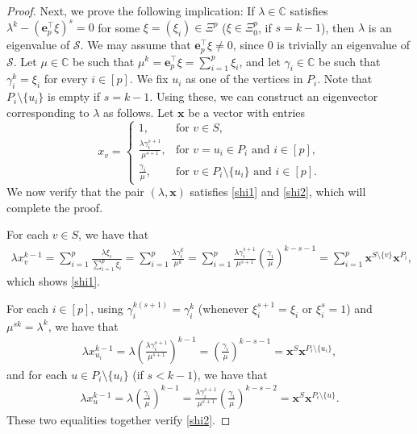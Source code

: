 \documentclass{article}
\begin{document}
\begin{proof}
Next, we prove the following implication: If $\lambda \in \mathbb{C}$ satisfies $\lambda^{k}-(\mathbf{e}_{p}^{\top}\xi)^{s}=0$ for some $\xi = (\xi_i) \in\Xi^{p}$ ($\xi\in\Xi_{0}^{p}$, if $s=k-1$), then $\lambda$ is an eigenvalue of $\mathcal{S}$.
We may assume that $\mathbf{e}_{p}^{\top}\xi \neq 0$, since $0$ is trivially an eigenvalue of $\mathcal{S}$.
Let $\mu \in\mathbb{C}$ be such that $\mu^{k}=\mathbf{e}_{p}^{\top}\xi =\sum_{i=1}^p \xi_i$, and let $\gamma_i \in\mathbb{C}$ be such that $\gamma_i^k =\xi_i$ for every $i \in [p]$.
We fix $u_{i}$ as one of the vertices in $P_{i}$. Note that $P_{i}\setminus\{u_{i}\}$ is empty if $s=k-1$. Using these, we can construct an eigenvector corresponding to $\lambda$ as follows. Let $\mathbf{x}$ be a vector with entries
\begin{equation*}
x_{v}=\begin{cases}
1, &\text{for $v\in S$},\\
\frac{\lambda \gamma_i^{s+1}}{\mu^{s+1}}, &\text{for $v=u_{i}\in P_{i}$ and $i\in[p]$},\\
\frac{\gamma_i}{\mu}, &\text{for $v\in P_{i}\setminus\{u_{i}\}$ and $i\in[p]$}.
\end{cases}
\end{equation*}
We now verify that the pair $(\lambda,\mathbf{x})$ satisfies \eqref{shi1} and \eqref{shi2}, which will complete the proof.

For each $v\in S$, we have that
\begin{align*}
\lambda x_{v}^{k-1}=\sum_{i=1}^{p}\frac{\lambda \xi_i}{\sum_{i=1}^p \xi_i}=
\sum_{i=1}^{p}\frac{\lambda \gamma_i^k}{\mu^k}=\sum_{i=1}^{p}\frac{\lambda \gamma_i^{s+1}}{\mu^{s+1}}\left(\frac{\gamma_i}{\mu}\right)^{k-s-1}=\sum_{i=1}^p\mathbf{x}^{S\setminus\{v\}}\mathbf{x}^{P_{i}},
\end{align*}
which shows  \eqref{shi1}.

For each $i\in[p]$, using $\gamma_i^{k(s+1)}=\gamma_i^k$ (whenever $\xi_i^{s+1}=\xi_i$ or $\xi_i^{s}=1$) and $\mu^{sk}=\lambda^k$, we have that
\begin{align*}
\lambda x_{u_{i}}^{k-1}=\lambda\left(\frac{\lambda\gamma_i^{s+1}}{\mu^{s+1}}\right)^{k-1}= \left(\frac{\gamma_i}{\mu}\right)^{k-s-1}=\mathbf{x}^{S}\mathbf{x}^{P_{i}\setminus\{u_{i}\}},
\end{align*}
and for each $u\in P_{i}\setminus\{u_{i}\}$ (if $s < k-1$),
we have that
\begin{align*}
\lambda x_{u}^{k-1}
=\lambda\left(\frac{\gamma_i}{\mu}\right)^{k-1}=\frac{\lambda\gamma_i^{s+1}}{\mu^{s+1}}\left(\frac{\gamma_i}{\mu}\right)^{k-s-2}=\mathbf{x}^{S}\mathbf{x}^{P_{i}\setminus\{u\}}.
\end{align*} These two equalities together verify \eqref{shi2}.
\end{proof}
\end{document}
